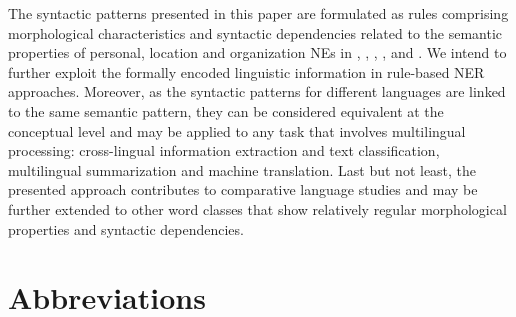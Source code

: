 \documentclass[output=paper]{langsci/langscibook}
\begin{document}
The syntactic patterns presented in this paper are formulated as rules
comprising morphological characteristics and syntactic dependencies
related to the semantic properties of personal, location and
organization NEs in , , , , and . We
intend to further exploit the formally encoded linguistic information
in rule-based NER approaches. Moreover, as the syntactic patterns for
different languages are linked to the same semantic pattern, they can
be considered equivalent at the conceptual level and may be applied to
any task that involves multilingual processing: cross-lingual
information extraction and text classification, multilingual
summarization and machine translation. Last but not least, the
presented approach contributes to comparative language studies and may
be further extended to other word classes that show relatively regular
morphological properties and syntactic dependencies.

\newpage

\section*{Abbreviations}
\end{document}
